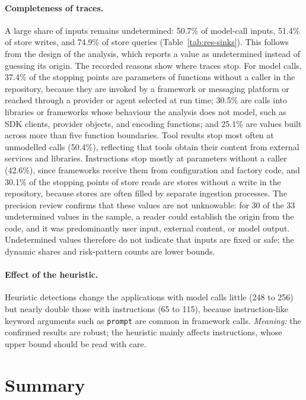\paragraph{Completeness of traces.} A large share of inputs remains undetermined: 50.7\% of model-call inputs, 51.4\% of store writes, and 74.9\% of store queries (Table~\ref{tab:res-sinks}). This follows from the design of the analysis, which reports a value as undetermined instead of guessing its origin. The recorded reasons show where traces stop. For model calls, 37.4\% of the stopping points are parameters of functions without a caller in the repository, because they are invoked by a framework or messaging platform or reached through a provider or agent selected at run time; 30.5\% are calls into libraries or frameworks whose behaviour the analysis does not model, such as SDK clients, provider objects, and encoding functions; and 25.1\% are values built across more than five function boundaries. Tool results stop most often at unmodelled calls (50.4\%), reflecting that tools obtain their content from external services and libraries. Instructions stop mostly at parameters without a caller (42.6\%), since frameworks receive them from configuration and factory code, and 30.1\% of the stopping points of store reads are stores without a write in the repository, because stores are often filled by separate ingestion processes. The precision review confirms that these values are not unknowable: for 30 of the 33 undetermined values in the sample, a reader could establish the origin from the code, and it was predominantly user input, external content, or model output. Undetermined values therefore do not indicate that inputs are fixed or safe; the dynamic shares and risk-pattern counts are lower bounds.

\paragraph{Effect of the heuristic.} Heuristic detections change the applications with model calls little (248 to 256) but nearly double those with instructions (65 to 115), because instruction-like keyword arguments such as \texttt{prompt} are common in framework calls. \emph{Meaning:} the confirmed results are robust; the heuristic mainly affects instructions, whose upper bound should be read with care.

\section{Summary}
\label{sec:res-summary}

